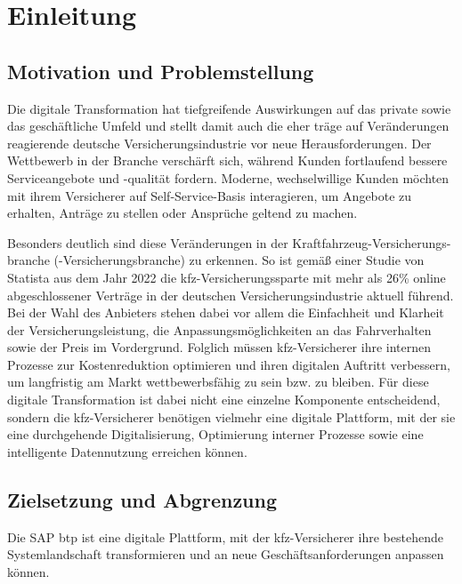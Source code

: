 \chapter{Einleitung}

\section{Motivation und Problemstellung}

Die digitale Transformation hat tiefgreifende Auswirkungen auf das private sowie das geschäftliche Umfeld und stellt damit auch die eher träge auf Veränderungen reagierende deutsche Versicherungsindustrie vor neue Herausforderungen. Der Wettbewerb in der Branche verschärft sich, während Kunden fortlaufend bessere Serviceangebote und -qualität fordern. Moderne, wechselwillige Kunden möchten mit ihrem Versicherer auf Self-Service-Basis interagieren, um Angebote zu erhalten, Anträge zu stellen oder Ansprüche geltend zu machen. \autocite[Vgl.][]{SCHMIDT2022}

Besonders deutlich sind diese Veränderungen in der Kraftfahrzeug-Versicherungs-branche (-Versicherungsbranche) zu erkennen. So ist gemäß einer Studie von Statista aus dem Jahr 2022 die \ac{kfz}-Versicherungssparte mit mehr als 26\% online abgeschlossener Verträge in der deutschen Versicherungsindustrie aktuell führend. \autocite[Vgl.][]{STATISTA2023} Bei der Wahl des Anbieters stehen dabei vor allem die Einfachheit und Klarheit der Versicherungsleistung, die Anpassungsmöglichkeiten an das Fahrverhalten sowie der Preis im Vordergrund. \autocite[Vgl.][]{MITZNER2023} Folglich müssen \ac{kfz}-Versicherer ihre internen Prozesse zur Kostenreduktion optimieren und ihren digitalen Auftritt verbessern, um langfristig am Markt wettbewerbsfähig zu sein bzw. zu bleiben. Für diese digitale Transformation ist dabei nicht eine einzelne Komponente entscheidend, sondern die \ac{kfz}-Versicherer benötigen vielmehr eine digitale Plattform, mit der sie eine durchgehende Digitalisierung, Optimierung interner Prozesse sowie eine intelligente Datennutzung erreichen können. \autocite[Vgl.][]{WEINGARTNER2023} 

\section{Zielsetzung und Abgrenzung}

Die SAP \ac{btp} ist eine digitale Plattform, mit der \ac{kfz}-Versicherer ihre bestehende Systemlandschaft transformieren und an neue Geschäftsanforderungen anpassen können.

